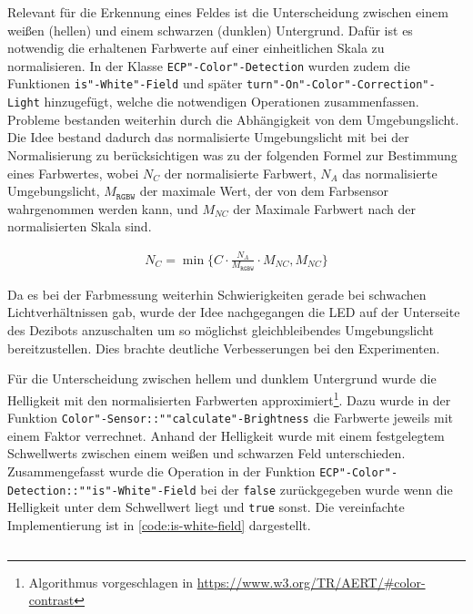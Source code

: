 Relevant für die Erkennung eines Feldes ist die Unterscheidung zwischen einem weißen (hellen) und einem schwarzen (dunklen) Untergrund. Dafür ist es notwendig die erhaltenen Farbwerte auf einer einheitlichen Skala zu normalisieren. In der Klasse \texttt{ECP"-Color"-Detection} wurden zudem die Funktionen \texttt{is"-White"-Field} und später \texttt{turn"-On"-Color"-Correction"-Light} hinzugefügt, welche die notwendigen Operationen zusammenfassen. Probleme bestanden weiterhin durch die Abhängigkeit von dem Umgebungslicht. Die Idee bestand dadurch das normalisierte Umgebungslicht mit bei der Normalisierung zu berücksichtigen was zu der folgenden Formel zur Bestimmung eines Farbwertes, wobei $N_{C}$ der normalisierte Farbwert, $N_{A}$ das normalisierte Umgebungslicht, $M_{\texttt{RGBW}}$ der maximale Wert, der von dem Farbsensor wahrgenommen werden kann, und $M_{NC}$ der Maximale Farbwert nach der normalisierten Skala sind.

\begin{equation*}
    \begin{aligned}
        N_{C} = \min\Big\{C \cdot \frac{N_{A}}{M_{\texttt{RGBW}}} \cdot M_{NC}, M_{NC}\Big\}
    \end{aligned}
\end{equation*}

Da es bei der Farbmessung weiterhin Schwierigkeiten gerade bei schwachen Lichtverhältnissen gab, wurde der Idee nachgegangen die LED auf der Unterseite des Dezibots anzuschalten um so möglichst gleichbleibendes Umgebungslicht bereitzustellen. Dies brachte deutliche Verbesserungen bei den Experimenten.

Für die Unterscheidung zwischen hellem und dunklem Untergrund wurde die Helligkeit mit den normalisierten Farbwerten approximiert\footnote{Algorithmus vorgeschlagen in \url{https://www.w3.org/TR/AERT/\#color-contrast}}. Dazu wurde in der Funktion \texttt{Color"-Sensor::""calculate"-Brightness} die Farbwerte jeweils mit einem Faktor verrechnet. Anhand der Helligkeit wurde mit einem festgelegtem Schwellwerts zwischen einem weißen und schwarzen Feld unterschieden. Zusammengefasst wurde die Operation in der Funktion \texttt{ECP"-Color"-Detection::""is"-White"-Field} bei der \texttt{false} zurückgegeben wurde wenn die Helligkeit unter dem Schwellwert liegt und \texttt{true} sonst. Die vereinfachte Implementierung ist in \autoref{code:is-white-field} dargestellt.

\begin{listing}[h]
    \inputminted{cpp}{../assets/code/ECPColorDetection-isWhiteField.cpp}
    \caption{Vereinfachter Code"=Ausschnitt zur \texttt{ECP"-Color"-Detection::""is"-White"-Field}"=Funktion.}
    \label{code:is-white-field}
\end{listing}


